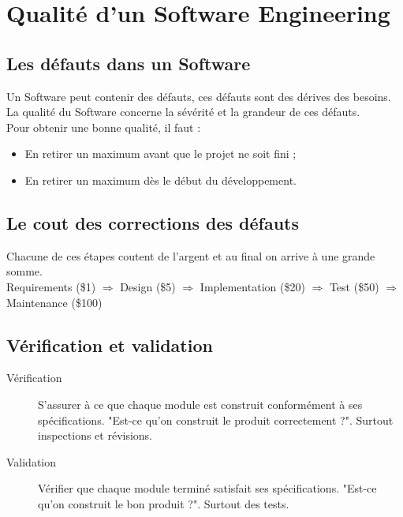 \section{Qualité d'un Software Engineering}



\subsection{Les défauts dans un Software}
Un Software peut contenir des défauts, ces défauts sont des dérives des besoins.
\\La qualité du Software concerne la sévérité et la grandeur de ces défauts.
\\Pour obtenir une bonne qualité, il faut :
\begin{itemize}
	\item En retirer un maximum avant que le projet ne soit fini ;
	\item En retirer un maximum dès le début du développement.
\end{itemize}


\subsection{Le cout des corrections des défauts}
Chacune de ces étapes coutent de l'argent et au final on arrive à une grande somme.
\\Requirements (\$1) $\Rightarrow$ Design (\$5) $\Rightarrow$ Implementation (\$20) $\Rightarrow$ Test (\$50) $\Rightarrow$ Maintenance (\$100)



\subsection{Vérification et validation}
\begin{description}
    \item [Vérification] S'assurer à ce que chaque module est construit conformément à ses spécifications. "Est-ce qu'on construit le produit correctement ?". Surtout inspections et révisions.
    \item [Validation] Vérifier que chaque module terminé satisfait ses spécifications. "Est-ce qu'on construit le bon produit ?". Surtout des tests.
\end{description}



